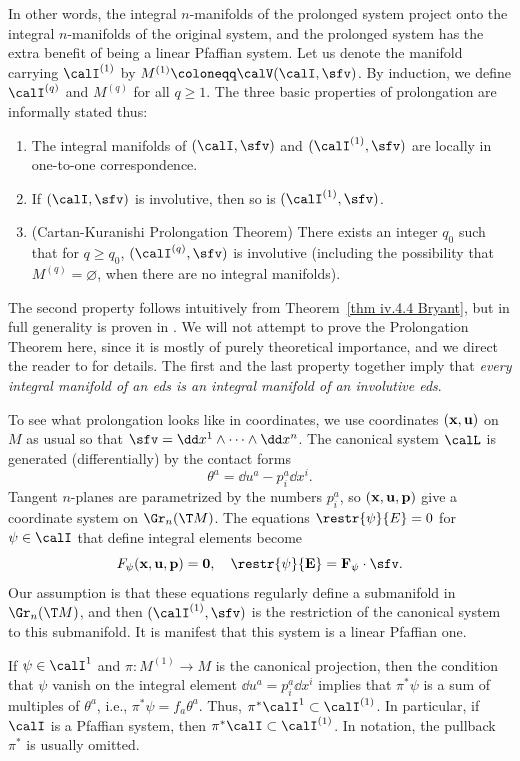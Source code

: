 In other words, the integral $n$-manifolds of the prolonged system project onto the integral $n$-manifolds of the original system, and the prolonged system has the extra benefit of being a linear Pfaffian system. Let us denote the manifold carrying $\calI^{(1)}$ by $M^{(1)}\coloneqq \calV(\calI,\sfv)$. By induction, we define $\calI^{(q)}$ and $M^{(q)}$ for all $q\geq 1$. The three basic properties of prolongation are informally stated thus:
\begin{enumerate}
    \item The integral manifolds of $(\calI,\sfv)$ and $(\calI^{(1)},\sfv)$ are locally in one-to-one correspondence.
    \item If $(\calI,\sfv)$ is involutive, then so is $(\calI^{(1)},\sfv)$.
    \item (Cartan-Kuranishi Prolongation Theorem) There exists an integer $q_0$ such that for $q\geq q_0$, $(\calI^{(q)},\sfv)$ is involutive (including the possibility that $M^{(q)}=\varnothing$, when there are no integral manifolds).
\end{enumerate}
The second property follows intuitively from Theorem~\ref{thm iv.4.4 Bryant}, but in full generality is proven in \cite[Prop.]{Bryant}. We will not attempt to prove the Prolongation Theorem here, since it is mostly of purely theoretical importance, and we direct the reader to \cite[Thm.~VI.3.2]{Bryant} for details. The first and the last property together imply that \emph{every integral manifold of an \gls{eds} is an integral manifold of an involutive \gls{eds}}.

\begin{rem}
    To see what prolongation looks like in coordinates, we use coordinates $(\bf{x},\bf{u})$ on $M$ as usual so that $\sfv=\dd x^1\wedge\cdots\wedge\dd x^n$. The canonical system $\calL$ is generated (differentially) by the contact forms 
    \[\theta^a=\dd u^a-p^a_i\dd x^i.\]
    Tangent $n$-planes are parametrized by the numbers $p^a_i$, so $(\bf{x},\bf{u},\bf{p})$ give a coordinate system on $\Gr_n(\T M)$. The equations $\restr{\psi}{E}=0$ for $\psi\in \calI$ that define integral elements become 
    \[F_\psi(\bf{x},\bf{u},\bf{p})=0,\quad \restr{\psi}{E}=F_\psi\cdot \sfv.\]
    Our assumption is that these equations regularly define a submanifold in $\Gr_n(\T M)$, and then $(\calI^{(1)},\sfv)$ is the restriction of the canonical system to this submanifold. It is manifest that this system is a linear Pfaffian one.
\end{rem}

\begin{rem}
    If $\psi\in\calI^1$ and $\pi:M^{(1)}\to M$ is the canonical projection, then the condition that $\psi$ vanish on the integral element $\dd u^a=p^a_i\dd x^i$ implies that $\pi^\ast \psi$ is a sum of multiples of $\theta^a$, i.e., $\pi^\ast\psi=f_a\theta^a$. Thus, $\pi^\ast\calI^1\subset\calI^{(1)}$. In particular, if $\calI$ is a Pfaffian system, then $\pi^\ast\calI\subset\calI^{(1)}$. In notation, the pullback $\pi^\ast$ is usually omitted.
\end{rem}


